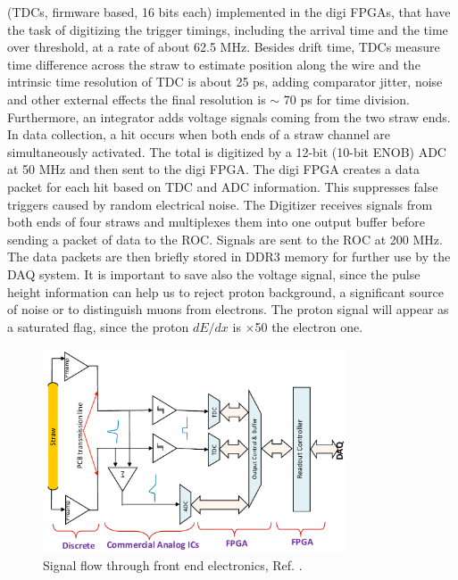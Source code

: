 (TDCs, firmware based, 16 bits each) implemented in the digi FPGAs, that have the task 
of digitizing the trigger timings, including the arrival time and the time over threshold, 
at a rate of about 62.5 MHz. Besides drift time, TDCs measure time difference across the 
straw to estimate position along the wire and the intrinsic time resolution of TDC is about 
25 ps, adding comparator jitter, noise and other external effects the final resolution is 
$\sim$ 70 ps for time division. Furthermore, an integrator adds voltage signals coming 
from the two straw ends. In data collection, a hit occurs when both ends of a straw channel 
are simultaneously activated. The total is digitized by a 12-bit (10-bit ENOB) ADC at 50 MHz 
and then sent to the digi FPGA. The digi FPGA creates a data packet for each hit based on 
TDC and ADC information. This suppresses false triggers caused by random electrical noise. 
The Digitizer receives signals from both ends of four straws and multiplexes them into one 
output buffer before sending a packet of data to the ROC. Signals are sent to the ROC at 
200 MHz. The data packets are then briefly stored in DDR3 memory for further use by the 
DAQ system. It is important to save also the voltage signal, since the pulse height 
information can help us to reject proton background, a significant source of noise 
or to distinguish muons from electrons. The proton signal will appear as a saturated flag, 
since the proton $dE/dx$ is $\times$50 the electron one.
\begin{figure}[!h]
\centering
\includegraphics[width =0.8\textwidth]{figures/png/Screenshot_20240203_135048.png}
\caption{Signal flow through front end electronics, Ref. \cite{bartoszek2015mu2e}.}
\label{fig:flowfee}
\end{figure}

